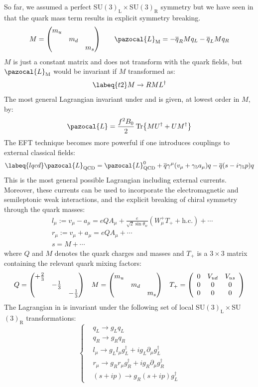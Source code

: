 \documentclass[../main.tex]{subfiles}
\begin{document}
So far, we assumed a perfect SU$(3)_{\text{L}}\times$SU$(3)_{\text{R}}$ symmetry but we have seen in  that the quark mass term results in explicit symmetry breaking.
\[
M=\mqty(\dmat{m_u,m_d,m_s}) \qquad \pazocal{L}_{\text{M}}=-\overline{q}_RMq_L-\overline{q}_LMq_R
\]
$M$ is just a constant matrix and does not transform with the quark fields, but $\pazocal{L}_{\text{M}}$ would be invariant if $M$ transformed as:
\begin{equation}
\labeq{t2}
M\to RML^\dagger
\end{equation}
The most general Lagrangian invariant under  and  is given, at lowest order in $M$, by:
\[
\pazocal{L}=\frac{f^2B_0}{2}\Tr{MU^\dagger+UM^\dagger}
\]
The EFT technique becomes more powerful if one introduces couplings to external classical fields:
\begin{equation}
\labeq{lqcd}
\pazocal{L}_{\text{QCD}}=\pazocal{L}_{\text{QCD}}^0+\overline{q}\gamma^\mu(v_\mu+\gamma_5a_\mu)q-\overline{q}(s-i\gamma_5p)q
\end{equation}
This is the most general possible Lagrangian including external currents. Moreover, these currents can be used to incorporate the electromagnetic and semileptonic weak interactions, and the explicit breaking of chiral symmetry through the quark masses:
\[
\begin{aligned}
&l_\mu:=v_\mu-a_\mu=eQA_\mu+\frac{e}{\sqrt{2}\sin\theta_w}(W_\mu^+ T_++\text{h.c.})+\cdots\\
&r_\mu:=v_\mu+a_\mu=eQA_\mu+\cdots\\
&s=M+\cdots
\end{aligned}
\]
where $Q$ and $M$ denotes the quark charges and masses and $T_+$ is a $3\times3$ matrix containing the relevant quark mixing factors:
\[
Q=\mqty(\dmat{+\frac{2}{3},-\frac{1}{3},-\frac{1}{3}}) \quad M=\mqty(\dmat{m_u,m_d,m_s}) \quad 
T_+=\left(\begin{array}{ccc}
    0 & V_{ud} & V_{us} \\
    0 & 0 & 0 \\
    0 & 0 & 0
\end{array}\right)
\]
The Lagrangian in  is invariant under the following set of local SU$(3)_{\text{L}}\times$SU$(3)_{\text{R}}$ transformations:
\[
\left\{
\begin{aligned}
&q_L\to g_Lq_L\\
&q_R\to g_Rq_R\\
&l_\mu\to g_Ll_\mu g_L^\dagger+ig_L\partial_\mu g_L^\dagger\\
&r_\mu\to g_Rr_\mu g_R^\dagger+ig_R\partial_\mu g_R^\dagger\\
&(s+ip)\to g_R(s+ip)g_L^\dagger
\end{aligned}
\right.
\]
\end{document}
